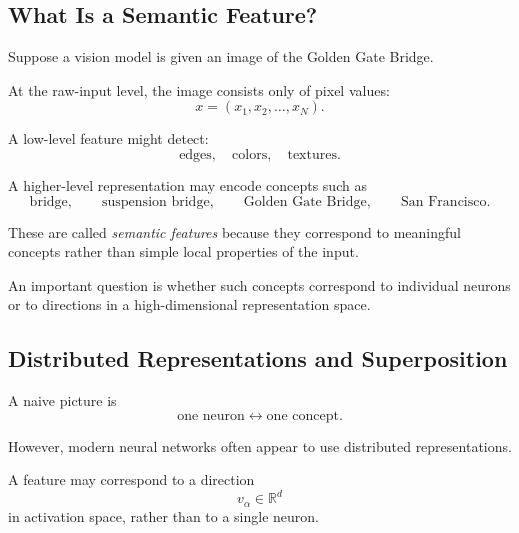 \subsection{What Is a Semantic Feature?}

Suppose a vision model is given an image of the Golden Gate Bridge.

At the raw-input level, the image consists only of pixel values:
\begin{equation}
    x
    =
    (x_1,x_2,\ldots,x_N).
\end{equation}

A low-level feature might detect:
\begin{equation}
    \text{edges},\quad
    \text{colors},\quad
    \text{textures}.
\end{equation}

A higher-level representation may encode concepts such as
\begin{equation}
    \text{bridge},
    \qquad
    \text{suspension bridge},
    \qquad
    \text{Golden Gate Bridge},
    \qquad
    \text{San Francisco}.
\end{equation}

These are called \emph{semantic features} because they correspond to meaningful
concepts rather than simple local properties of the input.

An important question is whether such concepts correspond to individual
neurons or to directions in a high-dimensional representation space.


\subsection{Distributed Representations and Superposition}

A naive picture is
\begin{equation}
    \text{one neuron}
    \leftrightarrow
    \text{one concept}.
\end{equation}

However, modern neural networks often appear to use distributed
representations.

A feature may correspond to a direction
\begin{equation}
    v_\alpha
    \in
    \mathbb R^d
\end{equation}
in activation space, rather than to a single neuron.

